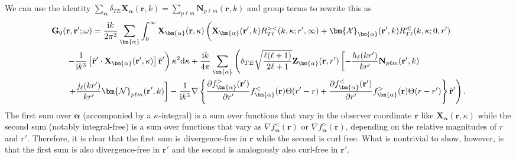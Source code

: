 We can use the identity $\sum_{\bm{\alpha}}\delta_{TE}\mathbf{X}_{\bm{\alpha}}(\mathbf{r},k) = \sum_{p\ell m}\mathbf{N}_{p\ell m}(\mathbf{r},k)$ and group terms to rewrite this as
\begin{equation}
\begin{split}
\mathbf{G}_0(&\mathbf{r},\mathbf{r}';\omega) = \frac{\mathrm{i}k}{2\pi^2}\sum_{\bm{\alpha}}\int_0^\infty\mathbf{X}_{\bm{\alpha}}(\mathbf{r},\kappa)\left( \vphantom{\frac{1}{4\pi k^2}} \mathbf{X}_{\bm{\alpha}}(\mathbf{r}',k)R_{T\ell}^{><}(k,\kappa;r',\infty) + \bm{\mathcal{X}}_{\bm{\alpha}}(\mathbf{r}',k)R_{T\ell}^\ll(k,\kappa;0,r')\right.\\
&\left. - \frac{1}{\mathrm{i} k^3}\left[\hat{\mathbf{r}}'\cdot\mathbf{X}_{\bm{\alpha}}(\mathbf{r}',\kappa)\right]\hat{\mathbf{r}}'\right)\kappa^2\mathrm{d}\kappa + \frac{\mathrm{i}k}{4\pi}\sum_{\bm{\alpha}}\left(\delta_{TE}\sqrt{\frac{\ell(\ell + 1)}{2\ell + 1}}\mathbf{Z}_{\bm{\alpha}}(\mathbf{r},r')\left[-\frac{h_\ell(kr')}{kr'}\mathbf{N}_{p\ell m}(\mathbf{r}',k)\right.\right.\\
&\left.\left.+ \frac{j_\ell(kr')}{kr'}\bm{\mathcal{N}}_{p\ell m}(\mathbf{r}',k)\right] -\frac{1}{\mathrm{i} k^3}\nabla\left\{\frac{\partial f_{\bm{\alpha}}^>(\mathbf{r}')}{\partial r'}f_{\bm{\alpha}}^<(\mathbf{r})\Theta(r' - r) + \frac{\partial f_{\bm{\alpha}}^<(\mathbf{r}')}{\partial r'}f_{\bm{\alpha}}^>(\mathbf{r})\Theta(r - r')\right\}\hat{\mathbf{r}}' \vphantom{\sqrt{\frac{\ell(\ell + 1)}{2\ell + 1}}} \right).
\end{split}
\end{equation}
The first sum over $\bm{\alpha}$ (accompanied by a $\kappa$-integral) is a sum over functions that vary in the observer coordinate $\mathbf{r}$ like $\mathbf{X}_{\bm{\alpha}}(\mathbf{r},\kappa)$ while the second sum (notably integral-free) is a sum over functions that vary as $\nabla f_{\bm{\alpha}}^<(\mathbf{r})$ or $\nabla f_{\bm{\alpha}}^>(\mathbf{r})$, depending on the relative magnitudes of $r$ and $r'$. Therefore, it is clear that the first sum is divergence-free in $\mathbf{r}$ while the second is curl free. What is nontrivial to show, however, is that the first sum is also divergence-free in $\mathbf{r}'$ and the second is analogously also curl-free in $\mathbf{r}'$.

